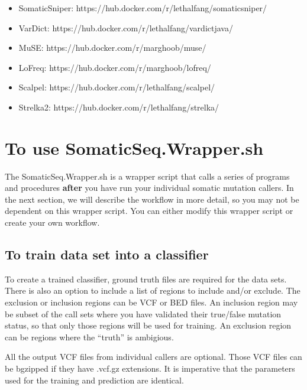 \documentclass[10pt,letterpaper]{article}
\begin{document}
\begin{sloppypar}
\begin{itemize}
  \item SomaticSniper: https://hub.docker.com/r/lethalfang/somaticsniper/

  \item VarDict: https://hub.docker.com/r/lethalfang/vardictjava/

  \item MuSE: https://hub.docker.com/r/marghoob/muse/

  \item LoFreq: https://hub.docker.com/r/marghoob/lofreq/

  \item Scalpel: https://hub.docker.com/r/lethalfang/scalpel/

  \item Strelka2: https://hub.docker.com/r/lethalfang/strelka/

\end{itemize}


\section{To use SomaticSeq.Wrapper.sh}

The SomaticSeq.Wrapper.sh is a wrapper script that calls a series of programs and procedures \textbf{after} you have run your individual somatic mutation callers. In the next section, we will describe the workflow in more detail, so you may not be dependent on this wrapper script. You can either modify this wrapper script or create your own workflow. 


\subsection{To train data set into a classifier}

To create a trained classifier, ground truth files are required for the data sets. There is also an option to include a list of regions to include and/or exclude. The exclusion or inclusion regions can be VCF or BED files. An inclusion region may be subset of the call sets where you have validated their true/false mutation status, so that only those regions will be used for training. An exclusion region can be regions where the ``truth'' is ambigious. 

All the output VCF files from individual callers are optional. Those VCF files can be bgzipped if they have .vcf.gz extensions. It is imperative that the parameters used for the training and prediction are identical. 



\end{sloppypar}
\end{document}
